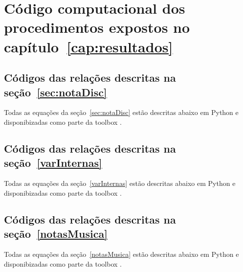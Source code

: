 \chapter{Código computacional dos procedimentos expostos no capítulo~\ref{cap:resultados}}
\label{cap:codigoProc}

\section{Códigos das relações descritas na seção~\ref{sec:notaDisc}}\label{sec:cod1}
Todas as equações da seção~\ref{sec:notaDisc} estão descritas abaixo em Python e disponibizadas como parte da toolbox \massa.\cite{MASSA}






\section{Códigos das relações descritas na seção~\ref{varInternas}}\label{sec:cod2}
Todas as equações da seção~\ref{varInternas} estão descritas abaixo em Python e disponibizadas como parte da toolbox \massa.





\section{Códigos das relações descritas na seção~\ref{notasMusica}}\label{sec:cod3}
Todas as equações da seção~\ref{notasMusica} estão descritas abaixo em Python e disponibizadas como parte da toolbox \massa.


